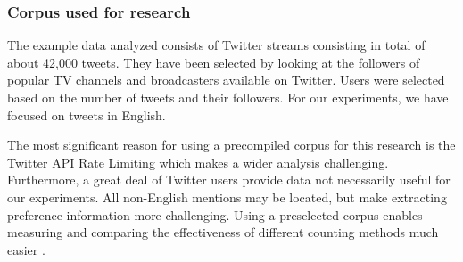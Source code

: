 \subsubsection{Corpus used for research}

The example data analyzed consists of Twitter streams consisting in total of about 42,000 tweets.
They have been selected by looking at the followers of popular TV channels and broadcasters
available on Twitter. Users were selected based on the number of tweets and their followers.
For our experiments, we have focused on tweets in English.

The most significant reason for using a precompiled corpus for this research is the Twitter API Rate Limiting
which makes a wider analysis challenging. Furthermore, a great deal of Twitter users provide data not necessarily
useful for our experiments. All non-English mentions may be located,
but make extracting preference information more challenging. Using a preselected corpus enables measuring and comparing the effectiveness of different counting methods much easier \cite{short-tweet}.
